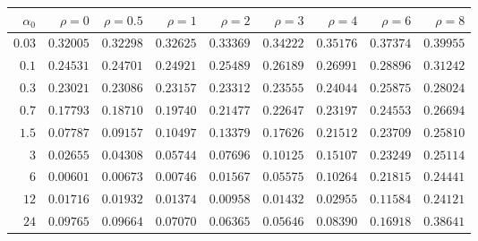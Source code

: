 \begin{tabular}{rrrrrrrrr}
\hline
$\alpha_0$ & $\rho=0$ & $\rho=0.5$ & $\rho=1$ & $\rho=2$ & $\rho=3$ & $\rho=4$ & $\rho=6$ & $\rho=8$ \\
\hline
$0.03$ & $0.32005$ & $0.32298$ & $0.32625$ & $0.33369$ & $0.34222$ & $0.35176$ & $0.37374$ & $0.39955$ \\
$0.1$ & $0.24531$ & $0.24701$ & $0.24921$ & $0.25489$ & $0.26189$ & $0.26991$ & $0.28896$ & $0.31242$ \\
$0.3$ & $0.23021$ & $0.23086$ & $0.23157$ & $0.23312$ & $0.23555$ & $0.24044$ & $0.25875$ & $0.28024$ \\
$0.7$ & $0.17793$ & $0.18710$ & $0.19740$ & $0.21477$ & $0.22647$ & $0.23197$ & $0.24553$ & $0.26694$ \\
$1.5$ & $0.07787$ & $0.09157$ & $0.10497$ & $0.13379$ & $0.17626$ & $0.21512$ & $0.23709$ & $0.25810$ \\
$3$ & $0.02655$ & $0.04308$ & $0.05744$ & $0.07696$ & $0.10125$ & $0.15107$ & $0.23249$ & $0.25114$ \\
$6$ & $\mathbf{0.00601}$ & $0.00673$ & $0.00746$ & $0.01567$ & $0.05575$ & $0.10264$ & $0.21815$ & $0.24441$ \\
$12$ & $0.01716$ & $0.01932$ & $0.01374$ & $0.00958$ & $0.01432$ & $0.02955$ & $0.11584$ & $0.24121$ \\
$24$ & $0.09765$ & $0.09664$ & $0.07070$ & $0.06365$ & $0.05646$ & $0.08390$ & $0.16918$ & $0.38641$ \\
\hline
\end{tabular}

